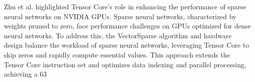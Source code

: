 Zhu et al. highlighted Tensor Core's role in enhancing the performance of sparse neural networks on NVIDIA GPUs. Sparse neural networks, characterized by weights pruned to zero, face performance challenges on GPUs optimized for dense neural networks. To address this, the VectorSparse algorithm and hardware design balance the workload of sparse neural networks, leveraging Tensor Core to skip zeros and rapidly compute essential values. This approach extends the Tensor Core instruction set and optimizes data indexing and parallel processing, achieving a 63%
